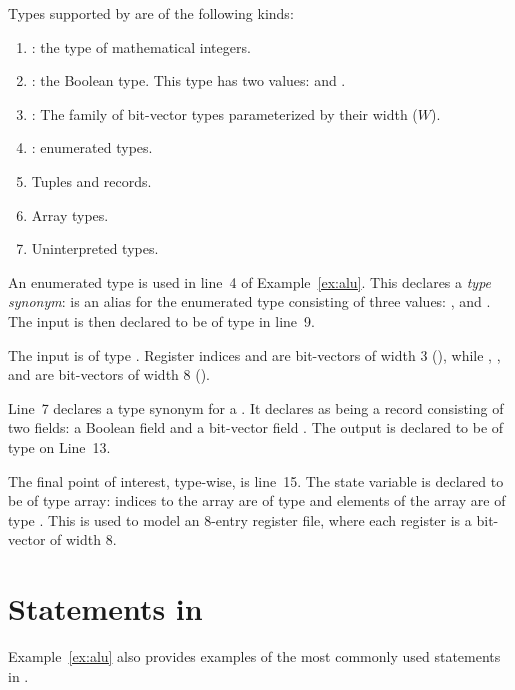 Types supported by \uclid{} are of the following kinds: 
\begin{enumerate}
    \item {}: the type of mathematical integers.
    \item {}: the Boolean type. This type has two values:  and .
    \item {}: The family of bit-vector types parameterized by their width ($W$).
    \item {}: enumerated types.
    \item Tuples and records.
    \item Array types.
    \item Uninterpreted types.
\end{enumerate}

An enumerated type is used in line~4 of Example~\ref{ex:alu}. This declares a \textit{type synonym}:  is an alias for the enumerated type consisting of three values: ,  and . The input  is then declared to be of type  in line~9. 

The input  is of type . Register indices  and  are bit-vectors of width 3 (), while , ,  and  are bit-vectors of width 8 ().

Line~7 declares a type synonym for a . It declares  as being a record consisting of two fields: a Boolean field  and a bit-vector field . The output  is declared to be of type  on Line~13.

The final point of interest, type-wise, is line~15. The state variable  is declared to be of type array: indices to the array are of type  and elements of the array are of type . This is used to model an 8-entry register file, where each register is a bit-vector of width 8.

\section{Statements in \uclid{}}

Example~\ref{ex:alu} also provides examples of the most commonly used statements in \uclid{}. 

